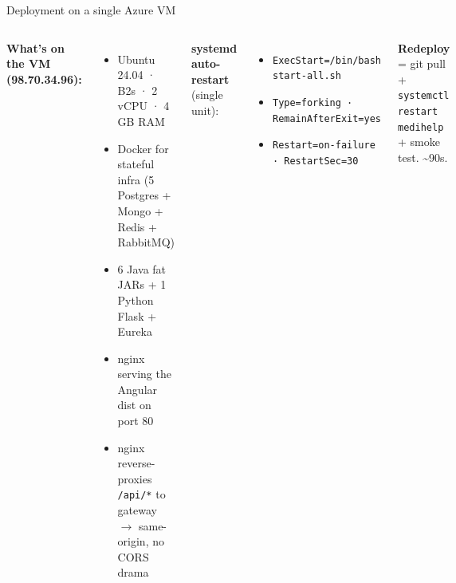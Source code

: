 \documentclass[aspectratio=169,11pt]{beamer}
\begin{document}
\begin{frame}{Deployment on a single Azure VM}
  \begin{columns}[T]
    \footnotesize
    \textbf{What's on the VM (98.70.34.96):}
    \begin{itemize}
      \item Ubuntu 24.04 · B2s · 2 vCPU · 4 GB RAM
      \item Docker for stateful infra (5 Postgres + Mongo + Redis + RabbitMQ)
      \item 6 Java fat JARs + 1 Python Flask + Eureka
      \item nginx serving the Angular dist on port 80
      \item nginx reverse-proxies \texttt{/api/*} to gateway $\rightarrow$ same-origin, no CORS drama
    \end{itemize}
    \footnotesize
    \textbf{systemd auto-restart} (single unit):
    \begin{itemize}
      \item \texttt{ExecStart=/bin/bash start-all.sh}
      \item \texttt{Type=forking · RemainAfterExit=yes}
      \item \texttt{Restart=on-failure · RestartSec=30}
    \end{itemize}
    \vspace{4pt}
    \textbf{Redeploy} = git pull + \texttt{systemctl restart medihelp} + smoke test. \textasciitilde90s.
  \end{columns}
\end{frame}
\end{document}
